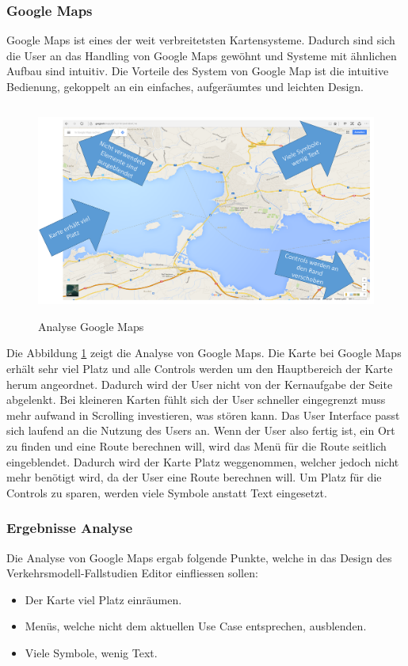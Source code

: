 \subsubsection{Google Maps}
Google Maps ist eines der weit verbreitetsten Kartensysteme. Dadurch sind sich die User an das Handling von Google Maps gewöhnt und Systeme mit ähnlichen Aufbau sind intuitiv. Die Vorteile des System von Google Map ist die intuitive Bedienung, gekoppelt an ein einfaches, aufgeräumtes und leichten Design.
\begin{figure}[H]
\centering
\includegraphics[height=7cm]{images/AnalyseGoogle.png}
\caption{Analyse Google Maps}
\label{fig:googlemaps}
\end{figure}
\noindent
Die Abbildung \ref{fig:googlemaps}  zeigt die Analyse von Google Maps. Die Karte bei Google Maps erhält sehr viel Platz und alle Controls werden um den Hauptbereich der Karte herum angeordnet. Dadurch wird der User nicht von der Kernaufgabe der Seite abgelenkt. Bei kleineren Karten fühlt sich der User schneller eingegrenzt muss mehr aufwand in Scrolling investieren, was stören kann. Das User Interface passt sich laufend an die Nutzung des Users an. Wenn der User also fertig ist, ein Ort zu finden und eine Route berechnen will, wird das Menü für die Route seitlich eingeblendet. Dadurch wird der Karte Platz weggenommen, welcher jedoch nicht mehr benötigt wird, da der User eine Route berechnen will. Um Platz für die Controls zu sparen, werden viele Symbole anstatt Text eingesetzt.
\subsubsection*{Ergebnisse Analyse}
Die Analyse von Google Maps ergab folgende Punkte, welche in das Design des Verkehrsmodell-Fallstudien Editor einfliessen sollen:
\begin{itemize}
\item Der Karte viel Platz einräumen.
\item Menüs, welche nicht dem aktuellen Use Case entsprechen, ausblenden.
\item Viele Symbole, wenig Text.
\end{itemize}
\newpage
